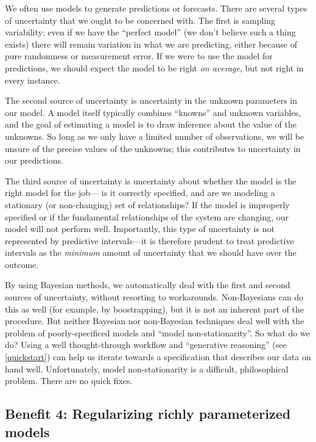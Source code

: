 \documentclass[]{book}
\begin{document}
We often use models to generate predictions or forecasts. There are
several types of uncertainty that we ought to be concerned with. The
first is sampling variability: even if we have the ``perfect model'' (we
don't believe such a thing exists) there will remain variation in what
we are predicting, either because of pure randomness or measurement
error. If we were to use the model for predictions, we should expect the
model to be right \emph{on average}, but not right in every instance.

The second source of uncertainty is uncertainty in the unknown
parameters in our model. A model itself typically combines ``knowns''
and unknown variables, and the goal of estimating a model is to draw
inference about the value of the unknowns. So long as we only have a
limited number of observations, we will be unsure of the precise values
of the unknowns; this contributes to uncertainty in our predictions.

The third source of uncertainty is uncertainty about whether the model
is the right model for the job--- is it correctly specified, and are we
modeling a stationary (or non-changing) set of relationships? If the
model is improperly specified or if the fundamental relationships of the
system are changing, our model will not perform well. Importantly, this
type of uncertainty is not represented by predictive intervals---it is
therefore prudent to treat predictive intervals as the \emph{minimum}
amount of uncertainty that we should have over the outcome.

By using Bayesian methods, we automatically deal with the first and
second sources of uncertainty, without resorting to workarounds.
Non-Bayesians can do this as well (for example, by boostrapping), but it
is not an inherent part of the procedure. But neither Bayesian nor
non-Bayesian techniques deal well with the problem of poorly-specificed
models and ``model non-stationarity''. So what do we do? Using a well
thought-through workflow and ``generative reasoning'' (see
\ref{quickstart}) can help us iterate towards a specification that
describes our data on hand well. Unfortunately, model non-stationarity
is a difficult, philosophical problem. There are no quick fixes.

\subsection*{Benefit 4: Regularizing richly parameterized
models}\label{benefit-4-regularizing-richly-parameterized-models}
\end{document}
